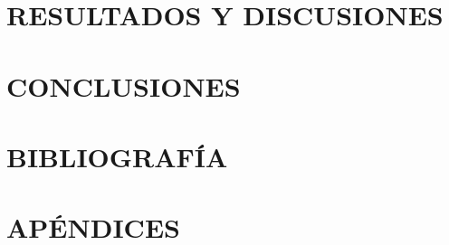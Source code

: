 \documentclass[10pt]{article}
\begin{document}
\section{RESULTADOS Y DISCUSIONES}

%




\newpage
\setcounter{equation}{0} %
\setcounter{figure}{0} %
\setcounter{table}{0} %
\section{CONCLUSIONES}






\newpage
\setcounter{equation}{0} %
\setcounter{figure}{0} %
\setcounter{table}{0} %
\section{BIBLIOGRAFÍA}
 
 


\newpage
\pagestyle{empty} %
\setcounter{equation}{0} %
\setcounter{figure}{0} %
\setcounter{table}{0} %
\renewcommand{\thesubsection}{APÉNDICE \Alph{subsection}:}                            %
\renewcommand{\thesubsubsection}{\Alph{subsection}.\arabic{subsubsection}:}       %
\renewcommand{\theequation}{.\Alph{subsection}\arabic{equation}} %
\renewcommand{\thefigure}{\Alph{subsection}.\arabic{figure}} %
\renewcommand{\thetable}{\Alph{subsection}.\arabic{table}} %

\section*{APÉNDICES}

%
\end{document}
